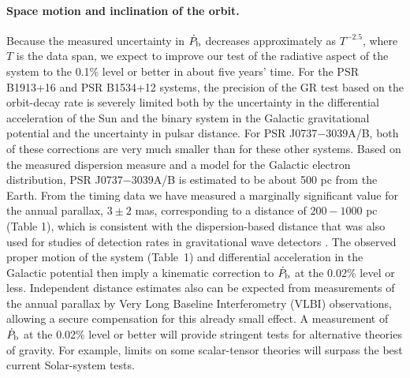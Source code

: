 \documentclass[12pt,psfig]{article}
\begin{document}
\paragraph*{Space motion and inclination of the orbit.}


Because the measured uncertainty in $\dot{P}_{\rm b}$ decreases approximately
as $T^{-2.5}$, where $T$ is the data span, we expect to improve our test of
the radiative aspect of the system to the 0.1\% level or better in about five
years' time.  For the PSR B1913+16 and PSR B1534+12 systems, the precision of
the GR test based on the orbit-decay rate is severely limited both by the
uncertainty in the differential acceleration of the Sun and the binary system
in the Galactic gravitational potential and the uncertainty in pulsar
distance\cite{dt91,sttw02}. For PSR J0737$-$3039A/B, both of these corrections
are very much smaller than for these other systems. 
Based on the measured dispersion measure and a model
for the Galactic electron distribution\cite{cl02}, PSR J0737$-$3039A/B is
estimated to be about 500 pc from the Earth. From the timing data we have
measured a marginally significant value for the annual parallax, $3\pm2$ mas,
corresponding to a distance of $200-1000$ pc (Table 1), 
which is consistent with the
dispersion-based distance that was also used for studies of detection rates in
gravitational wave detectors \cite{bdp+03}.  The observed proper motion of the
system (Table~1) and differential acceleration in the Galactic
potential\cite{kg89} then imply a kinematic correction to $\dot{P}_{\rm b}$ at
the 0.02\% level or less.  Independent distance estimates also can be expected
from measurements of the annual parallax by Very Long Baseline Interferometry
(VLBI) observations, allowing a secure compensation for this already small
effect. A measurement of $\dot{P}_{\rm b}$ at the 0.02\% level or better will
provide stringent tests for alternative theories of gravity.  For example,
limits on some scalar-tensor theories will surpass the best current
Solar-system tests\cite{de06}.
\end{document}
